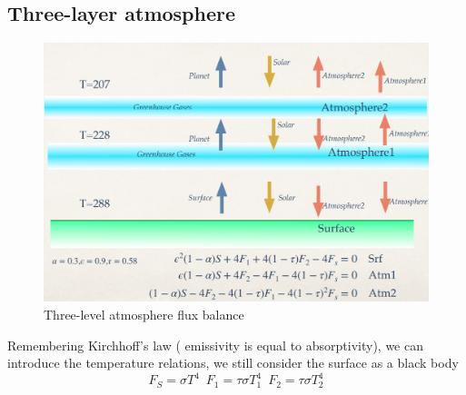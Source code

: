 \subsection{Three-layer atmosphere}
\begin{figure}[h!]
    \centering
    \includegraphics[width=0.65\linewidth]{uploads/Screenshot 2024-11-20 121339.png}
    \caption{Three-level atmosphere flux balance}
    \label{fig:three level}
\end{figure}
Remembering Kirchhoff’s law ( emissivity is equal to absorptivity), we
can introduce the temperature relations, we still consider the surface as a
black body $$F_S=\sigma T^4 \,\,\, F_1=\tau\sigma T_1^4 \,\,\, F_2=\tau\sigma T_2^4$$
